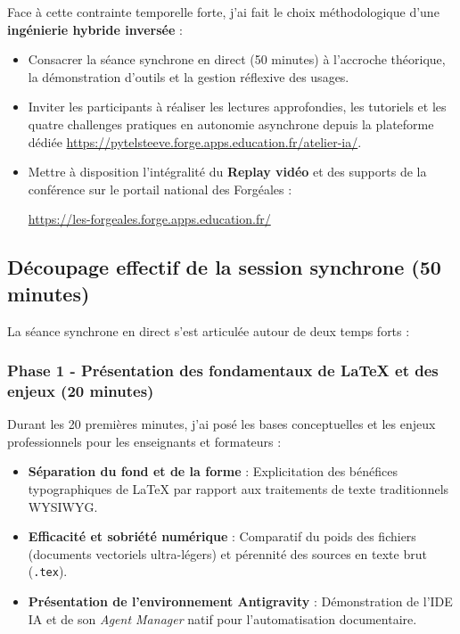 Face à cette contrainte temporelle forte, j'ai fait le choix méthodologique d'une \textbf{ingénierie hybride inversée} :
\begin{itemize}[leftmargin=*]
    \item Consacrer la séance synchrone en direct (50 minutes) à l'accroche théorique, la démonstration d'outils et la gestion réflexive des usages.
    \item Inviter les participants à réaliser les lectures approfondies, les tutoriels et les quatre challenges pratiques en autonomie asynchrone depuis la plateforme dédiée \url{https://pytelsteeve.forge.apps.education.fr/atelier-ia/}.
    \item Mettre à disposition l'intégralité du \textbf{Replay vidéo} et des supports de la conférence sur le portail national des Forgéales :
    \begin{center}
    \url{https://les-forgeales.forge.apps.education.fr/}
    \end{center}
\end{itemize}

\subsection{Découpage effectif de la session synchrone (50 minutes)}

La séance synchrone en direct s'est articulée autour de deux temps forts :

\subsubsection{Phase 1 - Présentation des fondamentaux de \LaTeX{} et des enjeux (20 minutes)}

Durant les 20 premières minutes, j'ai posé les bases conceptuelles et les enjeux professionnels pour les enseignants et formateurs :
\begin{itemize}[leftmargin=*]
    \item \textbf{Séparation du fond et de la forme} : Explicitation des bénéfices typographiques de \LaTeX{} par rapport aux traitements de texte traditionnels WYSIWYG.
    \item \textbf{Efficacité et sobriété numérique} : Comparatif du poids des fichiers (documents vectoriels ultra-légers) et pérennité des sources en texte brut (\texttt{.tex}).
    \item \textbf{Présentation de l'environnement Antigravity} : Démonstration de l'IDE IA et de son \textit{Agent Manager} natif pour l'automatisation documentaire.
\end{itemize}

